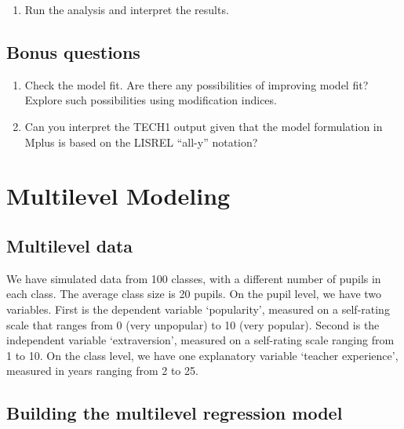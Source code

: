 \documentclass[
]{book}
\providecommand{\tightlist}{%
  \setlength{\itemsep}{0pt}\setlength{\parskip}{0pt}}
\begin{document}
\begin{enumerate}
\def\labelenumi{\arabic{enumi}.}
\setcounter{enumi}{2}
\tightlist
\item
  Run the analysis and interpret the results.
\end{enumerate}

\hypertarget{bonus-questions-2}{%
\section{Bonus questions}\label{bonus-questions-2}}

\begin{enumerate}
\def\labelenumi{\arabic{enumi}.}
\item
  Check the model fit. Are there any possibilities of improving model fit? Explore such possibilities using modification indices.
\item
  Can you interpret the TECH1 output given that the model formulation in Mplus is based on the LISREL ``all-y'' notation?
\end{enumerate}

\hypertarget{multilevel-modeling}{%
\chapter{Multilevel Modeling}\label{multilevel-modeling}}

\hypertarget{multilevel-data}{%
\section{Multilevel data}\label{multilevel-data}}

We have simulated data from 100 classes, with a different number of pupils in each class. The average class size is 20 pupils. On the pupil level, we have two variables. First is the dependent variable `popularity', measured on a self-rating scale that ranges from 0 (very unpopular) to 10 (very popular). Second is the independent variable `extraversion', measured on a self-rating scale ranging from 1 to 10. On the class level, we have one explanatory variable `teacher experience', measured in years ranging from 2 to 25.

\hypertarget{building-the-multilevel-regression-model}{%
\section{Building the multilevel regression model}\label{building-the-multilevel-regression-model}}
\end{document}
